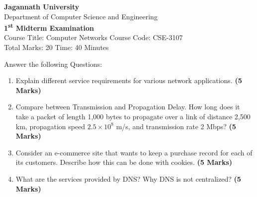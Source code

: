 \documentclass{article}
\begin{document}
\begin{center}
    \textbf{Jagannath University} \\
    Department of Computer Science and Engineering \\
    \textbf{1\textsuperscript{st} Midterm Examination} \\
    Course Title: Computer Networks \hspace{0.2cm} Course Code: CSE-3107 \\
    Total Marks: 20 \hspace{0.2cm} Time: 40 Minutes
\end{center}

\noindent Answer the following Questions:

\begin{enumerate}
    \item Explain different service requirements for various network applications. \hspace{1cm} \textbf{(5 Marks)}
    \item Compare between Transmission and Propagation Delay. How long does it take a packet of length 1,000 bytes to propagate over a link of distance 2,500 km, propagation speed \(2.5 \times 10^8\) m/s, and transmission rate 2 Mbps? \hspace{1cm} \textbf{(5 Marks)}
    \item Consider an e-commerce site that wants to keep a purchase record for each of its customers. Describe how this can be done with cookies. \hspace{1cm} \textbf{(5 Marks)}
    \item What are the services provided by DNS? Why DNS is not centralized? \hspace{1cm} \textbf{(5 Marks)}
\end{enumerate}
\end{document}
